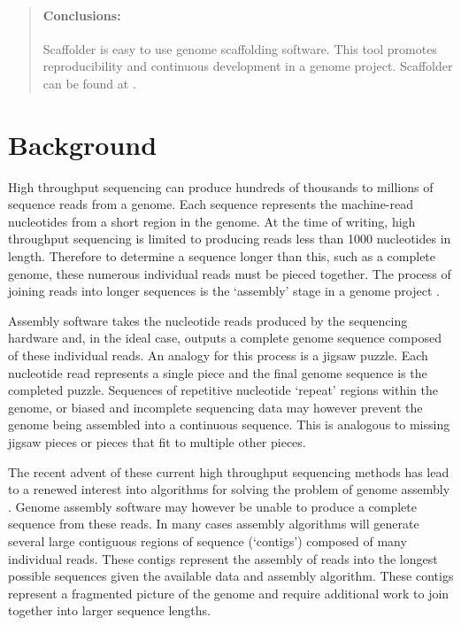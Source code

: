 \documentclass[10pt]{bmc_article}
\newenvironment{bmcformat}{\begin{raggedright}\baselineskip20pt\sloppy\setboolean{publ}{false}}{\end{raggedright}\baselineskip20pt\sloppy}
\begin{document}
\begin{bmcformat}
\begin{abstract}
  \paragraph*{Conclusions:} Scaffolder is easy to use genome scaffolding
  software. This tool promotes reproducibility and continuous development in a
  genome project. Scaffolder can be found at \scaffolder.

\end{abstract}


\clearpage

\section*{Background} %

High throughput sequencing can produce hundreds of thousands to millions of
sequence reads from a genome. Each sequence represents the machine-read
nucleotides from a short region in the genome. At the time of writing, high
throughput sequencing is limited to producing reads less than 1000 nucleotides
in length. Therefore to determine a sequence longer than this, such as
a complete genome, these numerous individual reads must be pieced together. The
process of joining reads into longer sequences is the `assembly' stage in
a genome project \cite{miller2010}. \pb

Assembly software takes the nucleotide reads produced by the sequencing
hardware and, in the ideal case, outputs a complete genome sequence composed of
these individual reads. An analogy for this process is a jigsaw puzzle. Each
nucleotide read represents a single piece and the final genome sequence is the
completed puzzle. Sequences of repetitive nucleotide `repeat' regions within
the genome, or biased and incomplete sequencing data may however prevent the
genome being assembled into a continuous sequence. This is analogous to missing
jigsaw pieces or pieces that fit to multiple other pieces. \pb

The recent advent of these current high throughput sequencing methods has lead
to a renewed interest into algorithms for solving the problem of genome
assembly \cite{pop2008,pop2009}. Genome assembly software may however be unable
to produce a complete sequence from these reads. In many cases assembly
algorithms will generate several large contiguous regions of sequence
(`contigs') composed of many individual reads. These contigs represent the
assembly of reads into the longest possible sequences given the available data
and assembly algorithm. These contigs represent a fragmented picture of the
genome and require additional work to join together into larger sequence
lengths. \pb


\end{bmcformat}
\end{document}
